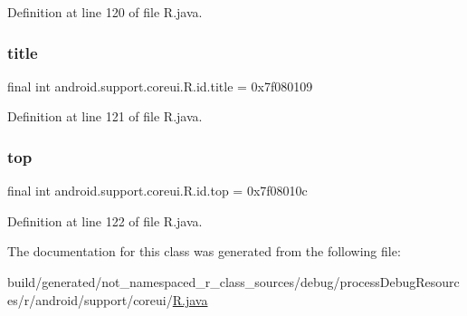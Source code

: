Definition at line 120 of file R.\+java.

\mbox{\label{classandroid_1_1support_1_1coreui_1_1_r_1_1id_acd9ab7fdae28f0ae11ffbf38849039fa}} 
\subsubsection{\texorpdfstring{title}{title}}
{\footnotesize\ttfamily final int android.\+support.\+coreui.\+R.\+id.\+title = 0x7f080109\hspace{0.3cm}{\ttfamily [static]}}



Definition at line 121 of file R.\+java.

\mbox{\label{classandroid_1_1support_1_1coreui_1_1_r_1_1id_ad51af01ed4af4016a2cfc10b83f10eff}} 
\subsubsection{\texorpdfstring{top}{top}}
{\footnotesize\ttfamily final int android.\+support.\+coreui.\+R.\+id.\+top = 0x7f08010c\hspace{0.3cm}{\ttfamily [static]}}



Definition at line 122 of file R.\+java.



The documentation for this class was generated from the following file\+:\begin{DoxyCompactItemize}
\item 
build/generated/not\+\_\+namespaced\+\_\+r\+\_\+class\+\_\+sources/debug/process\+Debug\+Resources/r/android/support/coreui/\mbox{\hyperlink{android_2support_2coreui_2_r_8java}{R.\+java}}\end{DoxyCompactItemize}

